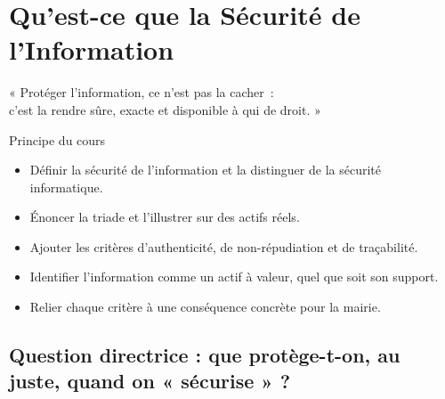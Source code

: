 
\chapter{Qu'est-ce que la Sécurité de l'Information}
\label{chap:cia}

\epigraph{%
    « Protéger l'information, ce n'est pas la cacher~:\\
    c'est la rendre sûre, exacte et disponible à qui de droit. »%
}{Principe du cours}


\begin{boxobjectifs}
\begin{itemize}
    \item Définir la sécurité de l'information et la distinguer de la sécurité
          informatique.
    \item Énoncer la triade  et l'illustrer sur des actifs réels.
    \item Ajouter les critères d'authenticité, de non-répudiation et de
          traçabilité.
    \item Identifier l'information comme un actif à valeur, quel que soit son
          support.
    \item Relier chaque critère à une conséquence concrète pour la mairie.
\end{itemize}
\end{boxobjectifs}

\bigskip

\section*{Question directrice : que protège-t-on, au juste, quand on « sécurise » ?}


